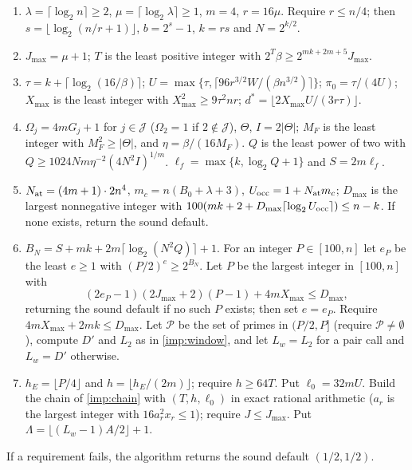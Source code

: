 \documentclass[11pt,letterpaper]{article}
\theoremstyle{definition}
\theoremstyle{remark}
\newcommand{\cP}{\mathcal P}
\newcommand{\cJ}{\mathcal J}
\newcommand{\lgx}{\log_2}
\newcommand{\Xmax}{X_{\max}}
\begin{document}
\begin{enumerate}[1.]
\item \(\lambda=\lceil\lgx n\rceil\ge2\), \(\mu=\lceil\lgx\lambda\rceil\ge1\),
\(m=4\), \(r=16\mu\). Require \(r\le n/4\); then
\(s=\lfloor\lgx(n/r+1)\rfloor\), \(b=2^s-1\), \(k=rs\) and
\(N=2^{k/2}\).
\item \(J_{\max}=\mu+1\); \(T\) is the least positive integer with
\(2^T\beta\ge2^{mk+2m+5}J_{\max}\).
\item \(\tau=k+\lceil\lgx(16/\beta)\rceil\);
\(U=\max\{\tau,\lceil96r^{3/2}W/(\beta n^{3/2})\rceil\}\);
\(\pi_0=\tau/(4U)\); \(\Xmax\) is the least integer with
\(\Xmax^2\ge9\tau^2nr\); \(d^*=\lfloor2\Xmax U/(3r\tau)\rfloor\).
\item \(\Omega_j=4mG_j+1\) for \(j\in\cJ\) (\(\Omega_2=1\) if \(2\notin\cJ\)),
\(\Theta\), \(I=2|\Theta|\); \(M_F\) is the least integer with
\(M_F^2\ge|\Theta|\), and \(\eta=\beta/(16M_F)\). \(Q\) is the least power
of two with \(Q\ge1024Nm\eta^{-2}(4N^2I)^{1/m}\).
\(\ell_f=\max\{k,\lgx Q+1\}\) and \(S=2m\ell_f\).
\item \(N_{\rm at}=(4m+1)\cdot2n^4\), \(m_c=n(B_0+\lambda+3)\),
\(U_{\rm occ}=1+N_{\rm at}m_c\); \(D_{\max}\) is the largest nonnegative integer with
\(100(mk+2+D_{\max}\lceil\lgx U_{\rm occ}\rceil)\le n-k\).
If none exists, return the sound default.
\item \(B_N=S+mk+2m\lceil\lgx(N^2Q)\rceil+1\). For an integer \(P\in[100,n]\) let
\(e_P\) be the least \(e\ge1\) with \((P/2)^e\ge2^{B_N}\). Let \(P\) be
the largest integer in \([100,n]\) with
\begin{equation}\label{eq:prime-budget}
 (2e_P-1)(2J_{\max}+2)(P-1)+4m\Xmax\le D_{\max},
\end{equation}
returning the sound default if no such \(P\) exists; then set
\(e=e_P\). Require \(4m\Xmax+2mk\le D_{\max}\). Let \(\cP\) be
the set of primes in \((P/2,P]\) (require \(\cP\ne\emptyset\)), compute
\(D'\) and \(L_2\) as in \cref{imp:window}, and let \(L_w=L_2\) for a
pair call and \(L_w=D'\) otherwise.
\item \(h_E=\lfloor P/4\rfloor\) and \(h=\lfloor h_E/(2m)\rfloor\); require
\(h\ge64T\). Put \(\ell_0=32mU\). Build the chain of \cref{imp:chain}
with \((T,h,\ell_0)\) in exact rational arithmetic (\(a_r\) is the largest
integer with \(16a_r^2x_r\le1\)); require \(J\le J_{\max}\). Put
\(\Lambda=\lfloor(L_w-1)A/2\rfloor+1\).
\end{enumerate}
If a requirement fails, the algorithm returns the sound default
\((1/2,1/2)\).
\end{document}
